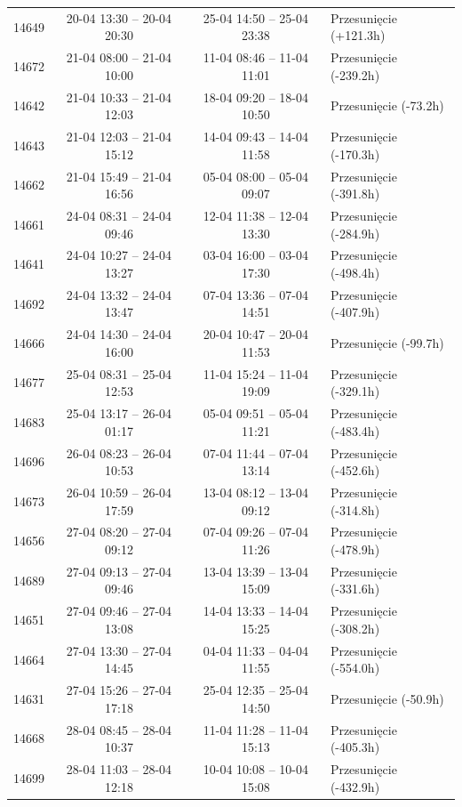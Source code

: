 \begin{table}[htbp]
\begin{tabular}{|r|c|c|l|}
14649 & 20-04 13:30 -- 20-04 20:30 & 25-04 14:50 -- 25-04 23:38 & Przesunięcie (+121.3h) \\ 
14672 & 21-04 08:00 -- 21-04 10:00 & 11-04 08:46 -- 11-04 11:01 & Przesunięcie (-239.2h) \\ 
14642 & 21-04 10:33 -- 21-04 12:03 & 18-04 09:20 -- 18-04 10:50 & Przesunięcie (-73.2h) \\ 
14643 & 21-04 12:03 -- 21-04 15:12 & 14-04 09:43 -- 14-04 11:58 & Przesunięcie (-170.3h) \\ 
14662 & 21-04 15:49 -- 21-04 16:56 & 05-04 08:00 -- 05-04 09:07 & Przesunięcie (-391.8h) \\ 
14661 & 24-04 08:31 -- 24-04 09:46 & 12-04 11:38 -- 12-04 13:30 & Przesunięcie (-284.9h) \\ 
14641 & 24-04 10:27 -- 24-04 13:27 & 03-04 16:00 -- 03-04 17:30 & Przesunięcie (-498.4h) \\ 
14692 & 24-04 13:32 -- 24-04 13:47 & 07-04 13:36 -- 07-04 14:51 & Przesunięcie (-407.9h) \\ 
14666 & 24-04 14:30 -- 24-04 16:00 & 20-04 10:47 -- 20-04 11:53 & Przesunięcie (-99.7h) \\ 
14677 & 25-04 08:31 -- 25-04 12:53 & 11-04 15:24 -- 11-04 19:09 & Przesunięcie (-329.1h) \\ 
14683 & 25-04 13:17 -- 26-04 01:17 & 05-04 09:51 -- 05-04 11:21 & Przesunięcie (-483.4h) \\ 
14696 & 26-04 08:23 -- 26-04 10:53 & 07-04 11:44 -- 07-04 13:14 & Przesunięcie (-452.6h) \\ 
14673 & 26-04 10:59 -- 26-04 17:59 & 13-04 08:12 -- 13-04 09:12 & Przesunięcie (-314.8h) \\ 
14656 & 27-04 08:20 -- 27-04 09:12 & 07-04 09:26 -- 07-04 11:26 & Przesunięcie (-478.9h) \\ 
14689 & 27-04 09:13 -- 27-04 09:46 & 13-04 13:39 -- 13-04 15:09 & Przesunięcie (-331.6h) \\ 
14651 & 27-04 09:46 -- 27-04 13:08 & 14-04 13:33 -- 14-04 15:25 & Przesunięcie (-308.2h) \\ 
14664 & 27-04 13:30 -- 27-04 14:45 & 04-04 11:33 -- 04-04 11:55 & Przesunięcie (-554.0h) \\ 
14631 & 27-04 15:26 -- 27-04 17:18 & 25-04 12:35 -- 25-04 14:50 & Przesunięcie (-50.9h) \\ 
14668 & 28-04 08:45 -- 28-04 10:37 & 11-04 11:28 -- 11-04 15:13 & Przesunięcie (-405.3h) \\ 
14699 & 28-04 11:03 -- 28-04 12:18 & 10-04 10:08 -- 10-04 15:08 & Przesunięcie (-432.9h) \\ 

\end{tabular}
\end{table}
